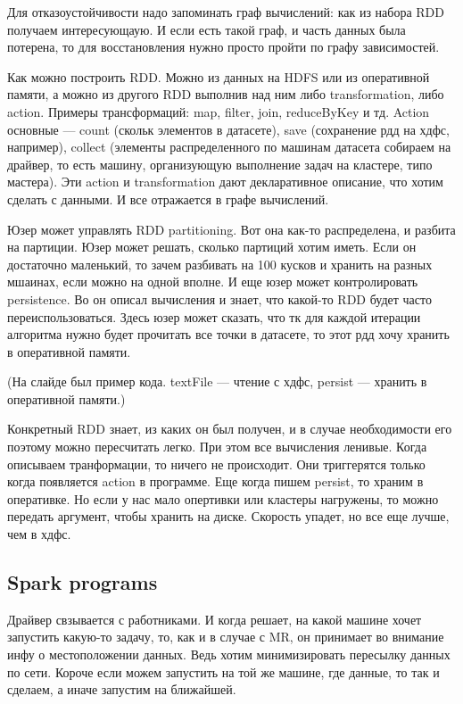 \documentclass[12pt]{article}
\begin{document}
Для отказоустойчивости надо запоминать граф вычислений: как из набора RDD получаем интересующаую. И если есть такой граф, и часть данных была потерена, то для восстановления нужно просто пройти по графу зависимостей.

Как можно построить RDD. Можно из данных на HDFS или из оперативной памяти, а можно из другого RDD выполнив над ним либо transformation, либо action. Примеры трансформаций: map, filter, join, reduceByKey и тд. Action основные --- count (скольк элементов в датасете), save (сохранение рдд на хдфс, например), collect (элементы распределенного по машинам датасета собираем на драйвер, то есть машину, организующую выполнение задач на кластере, типо мастера). Эти action и transformation дают декларативное описание, что хотим сделать с данными. И все отражается в графе вычислений.
    
Юзер может управлять RDD partitioning. Вот она как-то распределена, и разбита на партиции. Юзер может решать, сколько партиций хотим иметь. Если он достаточно маленький, то зачем разбивать на 100 кусков и хранить на разных мшаинах, если можно на одной вполне. И еще юзер может контролировать persistence. Во он описал вычисления и знает, что какой-то RDD будет часто переиспользоваться. Здесь юзер может сказать, что тк для каждой итерации алгоритма нужно будет прочитать все точки в датасете, то этот рдд хочу хранить в оперативной памяти.

(На слайде был пример кода. textFile --- чтение с хдфс, persist --- хранить в оперативной памяти.)

Конкретный RDD знает, из каких он был получен, и в случае необходимости его поэтому можно пересчитать легко. При этом все вычисления ленивые. Когда описываем транформации, то ничего не происходит. Они триггерятся только когда появляется action в программе. Еще когда пишем persist, то храним в оперативке. Но если у нас мало опертивки или кластеры нагружены, то можно передать аргумент, чтобы хранить на диске. Скорость упадет, но все еще лучше, чем в хдфс. 

\subsection{Spark programs}

Драйвер свзывается с работниками. И когда решает, на какой машине хочет запустить какую-то задачу, то, как и в случае с MR, он принимает во внимание инфу о местоположении данных. Ведь хотим минимизировать пересылку данных по сети. Короче если можем запустить на той же машине, где данные, то так и сделаем, а иначе запустим на ближайшей.
\end{document}
